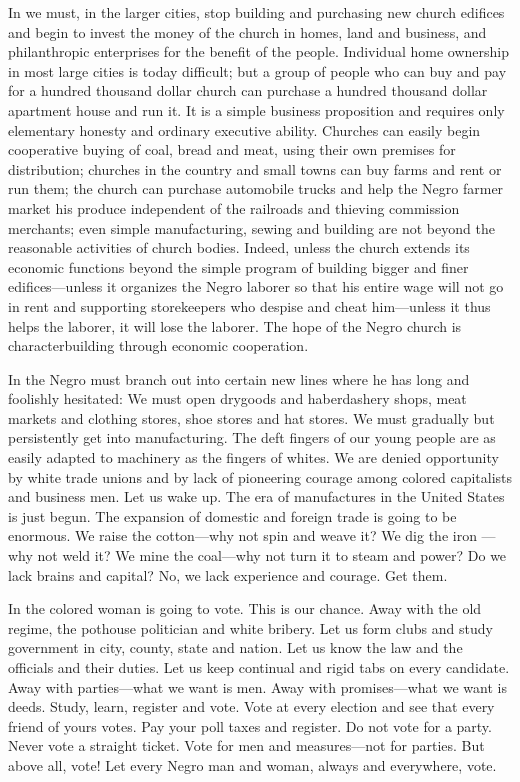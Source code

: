 \documentclass[letterpaper,10pt,english]{jupyterBook}
\begin{document}
\sphinxAtStartPar
In  we must, in the larger cities, stop building and purchasing new church edifices and begin to invest the money of the church in homes, land and business, and philanthropic enterprises for the benefit of the people. Individual home ownership in most large cities is today difficult; but a group of people who can buy and pay for a hundred thousand dollar church can purchase a hundred thousand dollar apartment house and run it. It is a simple business proposition and requires only elementary honesty and ordinary executive ability. Churches can easily begin co\sphinxhyphen{}operative buying of coal, bread and meat, using their own premises for distribution; churches in the country and small towns can buy farms and rent or run them; the church can purchase automobile trucks and help the Negro farmer market his produce independent of the railroads and thieving commission merchants; even simple manufacturing, sewing and building are not beyond the reasonable activities of church bodies. Indeed, unless the church extends its economic functions beyond the simple program of building bigger and finer edifices—unless it organizes the Negro laborer so that his entire wage will not go in rent and supporting storekeepers who despise and cheat him—unless it thus helps the laborer, it will lose the laborer. The hope of the Negro church is character\sphinxhyphen{}building through economic co\sphinxhyphen{}operation.

\sphinxAtStartPar
In  the Negro must branch out into certain new lines where he has long and foolishly hesitated: We must open drygoods and haberdashery shops, meat markets and clothing stores, shoe stores and hat stores. We must gradually but persistently get into manufacturing. The deft fingers of our young people are as easily adapted to machinery as the fingers of whites. We are denied opportunity by white trade unions and by lack of pioneering courage among colored capitalists and business men. Let us wake up. The era of manufactures in the United States is just begun. The expansion of domestic and foreign trade is going to be enormous. We raise the cotton—why not spin and weave it? We dig the iron —why not weld it? We mine the coal—why not turn it to steam and power? Do we lack brains and capital? No, we lack experience and courage. Get them.

\sphinxAtStartPar
In  the colored woman is going to vote. This is our chance. Away with the old regime, the pothouse politician and white bribery. Let us form clubs and study government in city, county, state and nation. Let us know the law and the officials and their duties. Let us keep continual and rigid tabs on every candidate. Away with parties—what we want is men. Away with promises—what we want is deeds. Study, learn, register and vote. Vote at every election and see that every friend of yours votes. Pay your poll taxes and register. Do not vote for a party. Never vote a straight ticket. Vote for men and measures—not for parties. But above all, vote! Let every Negro man and woman, always and everywhere, vote.
\end{document}
